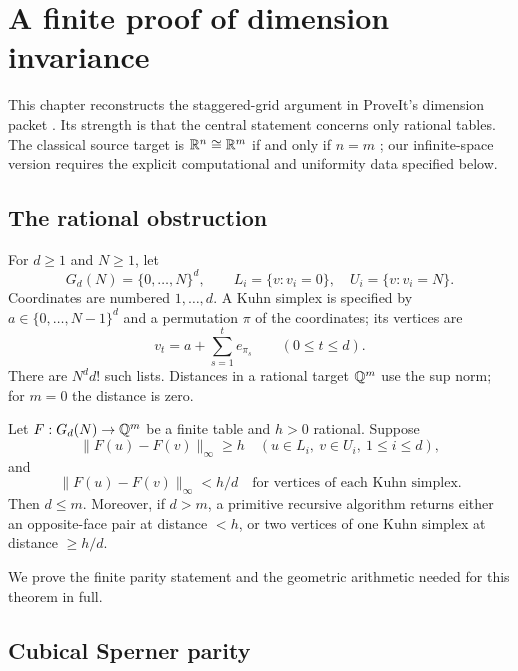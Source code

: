 \section{A finite proof of dimension invariance}
\label{sec:dimension}

This chapter reconstructs the staggered-grid argument in ProveIt's dimension packet \cite{RepoDimension}. Its strength is that the central statement concerns only rational tables. The classical source target is $\mathbb R^n\cong\mathbb R^m$ if and only if $n=m$ \cite{MWDimension}; our infinite-space version requires the explicit computational and uniformity data specified below.

\subsection{The rational obstruction}

For $d\geq1$ and $N\geq1$, let
\[
G_d(N)=\{0,\ldots,N\}^d,\qquad
L_i=\{v:v_i=0\},\quad U_i=\{v:v_i=N\}.
\]
Coordinates are numbered $1,\ldots,d$. A Kuhn simplex is specified by $a\in\{0,\ldots,N-1\}^d$ and a permutation $\pi$ of the coordinates; its vertices are
\[
v_t=a+\sum_{s=1}^t e_{\pi_s}\qquad(0\leq t\leq d).
\]
There are $N^d d!$ such lists. Distances in a rational target $\mathbb Q^m$ use the sup norm; for $m=0$ the distance is zero.

\begin{theorem}\label{thm:dimension-obstruction}
Let $F:G_d(N)\to\mathbb Q^m$ be a finite table and $h>0$ rational. Suppose
\[
\|F(u)-F(v)\|_\infty\geq h
\quad(u\in L_i,\ v\in U_i,\ 1\leq i\leq d),
\]
and
\[
\|F(u)-F(v)\|_\infty<h/d
\quad\text{for vertices of each Kuhn simplex}.
\]
Then $d\leq m$. Moreover, if $d>m$, a primitive recursive algorithm returns either an opposite-face pair at distance $<h$, or two vertices of one Kuhn simplex at distance $\geq h/d$.
\end{theorem}

We prove the finite parity statement and the geometric arithmetic needed for this theorem in full.

\subsection{Cubical Sperner parity}

